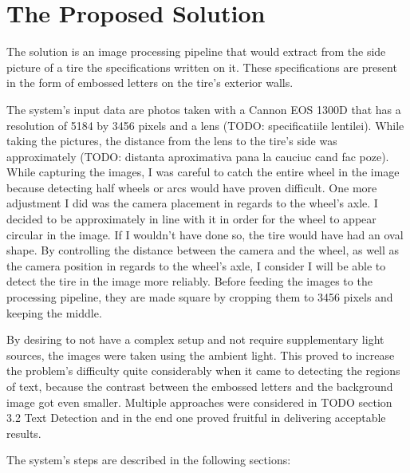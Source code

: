 \chapter{The Proposed Solution}\pagestyle{fancy}\setlength{\parindent}{3em}
\label{chap:proposed-solution}

The solution is an image processing pipeline that would extract from the side picture of a tire the specifications written on it. These specifications are present in the form of embossed letters on the tire's exterior walls.

The system's input data are photos taken with a Cannon EOS 1300D that has a resolution of 5184 by 3456 pixels and a lens (TODO: specificatiile lentilei). While taking the pictures, the distance from the lens to the tire's side was approximately (TODO: distanta aproximativa pana la cauciuc cand fac poze). While capturing the images, I was careful to catch the entire wheel in the image because detecting half wheels or arcs would have proven difficult. One more adjustment I did was the camera placement in regards to the wheel's axle. I decided to be approximately in line with it in order for the wheel to appear circular in the image. If I wouldn't have done so, the tire would have had an oval shape. By controlling the distance between the camera and the wheel, as  well as the camera position in regards to the wheel's axle, I consider I will be able to detect the tire in the image more reliably. Before feeding the images to the processing pipeline, they are made square by cropping them to 3456 pixels and keeping the middle.

By desiring to not have a complex setup and not require supplementary light sources, the images were taken using the ambient light. This proved to increase the problem's difficulty quite considerably when it came to detecting the regions of text, because the contrast between the embossed letters and the background image got even smaller. Multiple approaches were considered in TODO section 3.2 Text Detection and in the end one proved fruitful in delivering acceptable results.

The system's steps are described in the following sections:


